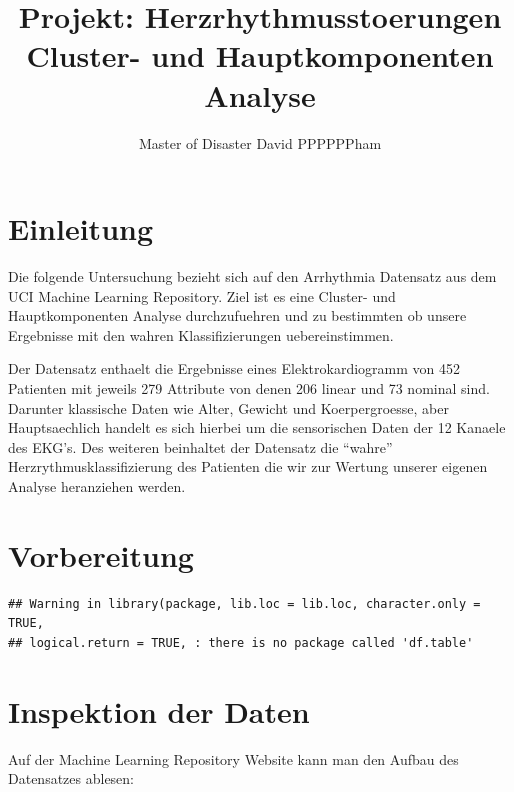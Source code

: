 \documentclass[
]{article}
\title{Projekt: Herzrhythmusstoerungen Cluster- und Hauptkomponenten Analyse}
\author{Master of Disaster David PPPPPPham}
\date{}
\begin{document}
\maketitle

{
\setcounter{tocdepth}{2}
\tableofcontents
}
\hypertarget{einleitung}{%
\section{Einleitung}\label{einleitung}}

Die folgende Untersuchung bezieht sich auf den Arrhythmia Datensatz aus
dem UCI Machine Learning Repository. Ziel ist es eine Cluster- und
Hauptkomponenten Analyse durchzufuehren und zu bestimmten ob unsere
Ergebnisse mit den wahren Klassifizierungen uebereinstimmen.

Der Datensatz enthaelt die Ergebnisse eines Elektrokardiogramm von 452
Patienten mit jeweils 279 Attribute von denen 206 linear und 73 nominal
sind. Darunter klassische Daten wie Alter, Gewicht und Koerpergroesse,
aber Hauptsaechlich handelt es sich hierbei um die sensorischen Daten
der 12 Kanaele des EKG's. Des weiteren beinhaltet der Datensatz die
``wahre'' Herzrythmusklassifizierung des Patienten die wir zur Wertung
unserer eigenen Analyse heranziehen werden.

\hypertarget{vorbereitung}{%
\section{Vorbereitung}\label{vorbereitung}}

\begin{verbatim}
## Warning in library(package, lib.loc = lib.loc, character.only = TRUE,
## logical.return = TRUE, : there is no package called 'df.table'
\end{verbatim}

\hypertarget{inspektion-der-daten}{%
\section{Inspektion der Daten}\label{inspektion-der-daten}}

Auf der Machine Learning Repository Website kann man den Aufbau des
Datensatzes ablesen:
\end{document}
